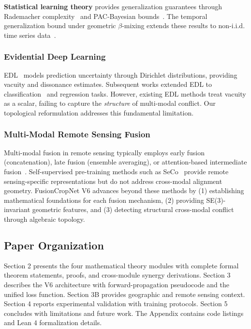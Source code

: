 \textbf{Statistical learning theory} provides generalization guarantees
through Rademacher complexity~\cite{bartlett2002rademacher} and PAC-Bayesian
bounds~\cite{mcallester1999pac}. The temporal generalization bound under
geometric $\beta$-mixing extends these results to non-i.i.d. time series
data~\cite{mohri2018foundations, kuznetsov2017generalization}.

\subsubsection{Evidential Deep Learning}

EDL~\cite{sensoy2018evidential} models prediction uncertainty through
Dirichlet distributions, providing vacuity and dissonance estimates.
Subsequent works extended EDL to classification~\cite{malinin2018predictive}
and regression tasks. However, existing EDL methods treat vacuity as a scalar,
failing to capture the \textit{structure} of multi-modal conflict. Our
topological reformulation addresses this fundamental limitation.

\subsubsection{Multi-Modal Remote Sensing Fusion}

Multi-modal fusion in remote sensing typically employs early fusion
(concatenation), late fusion (ensemble averaging), or attention-based
intermediate fusion~\cite{schmitt2020sen12ms}. Self-supervised pre-training
methods such as SeCo~\cite{manen2022seco} provide remote sensing-specific
representations but do not address cross-modal alignment geometry.
FusionCropNet V6 advances beyond these methods by (1) establishing
mathematical foundations for each fusion mechanism, (2) providing
SE(3)-invariant geometric features, and (3) detecting structural
cross-modal conflict through algebraic topology.

\subsection{Paper Organization}

Section 2 presents the four mathematical theory modules with complete formal
theorem statements, proofs, and cross-module synergy derivations. Section 3
describes the V6 architecture with forward-propagation pseudocode and the
unified loss function. Section 3B provides geographic and remote sensing
context. Section 4 reports experimental validation with training protocols.
Section 5 concludes with limitations and future work. The Appendix contains
code listings and Lean 4 formalization details.
